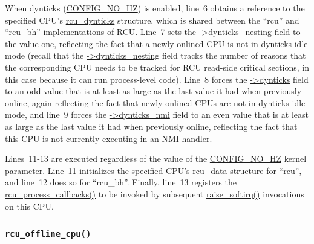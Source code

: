 When dynticks (\url{CONFIG_NO_HZ}) is enabled, line~6 obtains a
reference to the specified CPU's \url{rcu_dynticks} structure, which
is shared between the ``rcu'' and ``rcu\_bh'' implementations of RCU.
Line~7 sets the \url{->dynticks_nesting} field to the value one,
reflecting the fact that a newly onlined CPU is not in dynticks-idle
mode (recall that the \url{->dynticks_nesting} field tracks the
number of reasons that the corresponding CPU needs to be tracked for
RCU read-side critical sections, in this case because it can run
process-level code).
Line~8 forces the \url{->dynticks} field to an odd value that is
at least as large as the last value it had when previously online,
again reflecting the fact that newly onlined CPUs are not in dynticks-idle
mode, and line~9 forces the \url{->dynticks_nmi} field to an even value
that is at least as large as the last value it had when previously
online, reflecting the fact that this CPU is not currently executing
in an NMI handler.

Lines~11-13 are executed regardless of the value of the
\url{CONFIG_NO_HZ} kernel parameter.
Line~11 initializes the specified CPU's \url{rcu_data} structure
for ``rcu'', and line~12 does so for ``rcu\_bh''.
Finally, line~13 registers the \url{rcu_process_callbacks()} to be
invoked by subsequent \url{raise_softirq()} invocations on this CPU.

\subsubsection{\tt rcu\_offline\_cpu()}
\label{app:rcuimpl:rcutreewt:rcu-offline-cpu}

